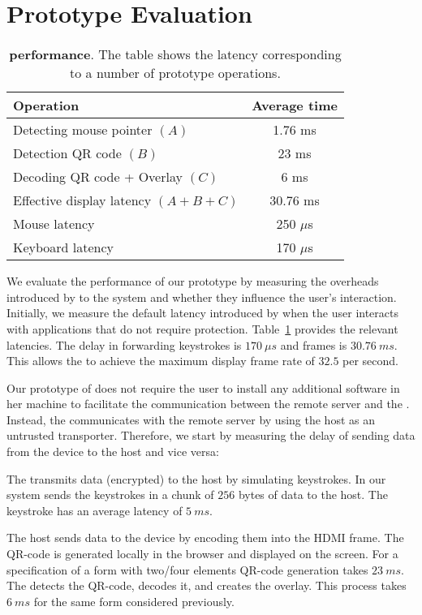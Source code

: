\section{Prototype Evaluation}
\label{sec:eval}


\begin{table}[t]
\scriptsize
\centering
\begin{tabular}{l | c}
\textbf{Operation} & \textbf{Average time} \\\hline
Detecting mouse pointer $(A)$ & 1.76 ms \\
Detection QR code $(B)$ & 23 ms\\
Decoding QR code + Overlay $(C)$ & 6 ms\\
Effective display latency $(A+B+C)$ & 30.76 ms \\
Mouse latency & 250 $\mu$s\\
Keyboard latency & 170 $\mu$s\\\hline
\end{tabular} 
\caption{\textbf{\device performance}. The table shows the latency corresponding to a number of \name prototype operations.}
\spacesave
\label{tab:performance}
\end{table}


We evaluate the performance of our prototype by measuring the overheads introduced by \name to the system and whether they influence the user's interaction. Initially, we measure the default latency introduced by \device when the user interacts with applications that do not require protection. Table~\ref{tab:performance} provides the relevant latencies.
The delay in forwarding keystrokes is $170\ \mu s$ and frames is $30.76\ ms$. This allows the \device to achieve the maximum display frame rate of $32.5$ per second.

Our prototype of \name does not require the user to install any additional software in her machine to facilitate the communication between the remote server and the \device. Instead, the \device communicates with the remote server by using the host as an untrusted transporter. Therefore, we start by measuring the delay of sending data from the device to the host and vice versa:

 The \device transmits data (encrypted) to the host by simulating keystrokes. In our system \device sends the keystrokes in a chunk of $256$ bytes of data to the host. The keystroke has an average latency of $5\ ms$.  

 The host sends data to the device by encoding them into the HDMI frame. The QR-code is generated locally in the browser and displayed on the screen. For a specification of a form with two/four elements QR-code generation takes $23\ ms$. The \device detects the QR-code, decodes it, and creates the overlay. This process takes $6\ ms$ for the same form considered previously.
 
